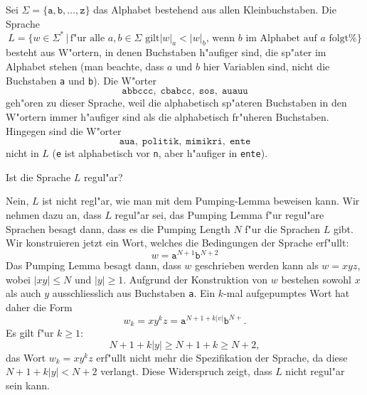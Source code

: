 Sei $\Sigma=\{\texttt{a},\texttt{b},\dots,\texttt{z}\}$ das Alphabet
bestehend aus allen Kleinbuchstaben. Die Sprache
\[
L=\{ w\in\Sigma^*
\,
|\,
\text{
f"ur alle $a,b\in\Sigma$ gilt
$|w|_a < |w|_b$, wenn $b$ im Alphabet auf $a$ folgt%
}
\}
\]
besteht aus W"ortern, in denen Buchstaben h"aufiger sind, die sp"ater im
Alphabet stehen (man beachte, dass $a$ und $b$ hier Variablen sind,
nicht die Buchstaben \texttt{a} und \texttt{b}).
Die W"orter
\[
\texttt{abbccc},\;
\texttt{cbabcc},\;
\texttt{sos},\;
\texttt{auauu}
\]
geh"oren zu dieser Sprache, weil die alphabetisch sp"ateren Buchstaben
in den W"ortern immer h"aufiger sind als die alphabetisch
fr"uheren Buchstaben. Hingegen sind die W"orter 
\[
\texttt{aua},\;
\texttt{politik},\;
\texttt{mimikri},\;
\texttt{ente}
\]
nicht in $L$ (\texttt{e} ist alphabetisch vor \texttt{n}, aber h"aufiger
in \texttt{ente}).

Ist die Sprache $L$ regul"ar?

\begin{loesung}
Nein, $L$ ist nicht regl"ar, wie man mit dem Pumping-Lemma beweisen kann.
Wir nehmen dazu an, dass $L$ regul"ar sei, das Pumping Lemma f"ur
regul"are Sprachen besagt dann, dass es die Pumping Length $N$ f"ur die
Sprachen $L$ gibt.
Wir konstruieren jetzt ein Wort, welches die Bedingungen der Sprache
erf"ullt:
\[
w=\texttt{a}^{N+1}\texttt{b}^{N+2}
\]
Das Pumping Lemma besagt dann, dass $w$ geschrieben werden kann als
$w=xyz$, wobei $|xy|\le N$ und $|y|\ge 1$. 
Aufgrund der Konstruktion von $w$ bestehen sowohl $x$ als auch $y$
ausschliesslich aus Buchstaben \texttt{a}.
Ein $k$-mal aufgepumptes Wort hat daher die Form
\[
w_k=xy^kz = \texttt{a}^{N+1+k|v|}\texttt{b}^{N+}.
\]
Es gilt f"ur $k\ge 1$:
\[
N+1+k|y|\ge N+1+k\ge N+2,
\]
das Wort $w_k=xy^kz$ erf"ullt nicht mehr die Spezifikation der Sprache,
da diese $N+1+k|y| < N+2$ verlangt.
Diese Widerspruch zeigt, dass $L$ nicht regul"ar sein kann.
\end{loesung}

